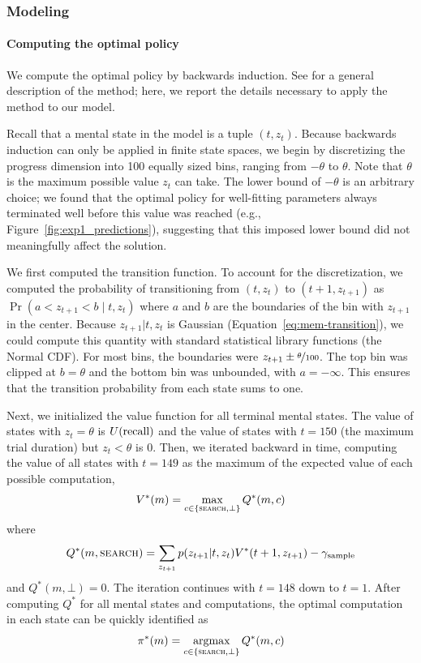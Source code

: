 \subsubsection{Modeling}

\paragraph{Computing the optimal policy}

We compute the optimal policy by backwards induction. See \citet{puterman2014markov} for a general description of the method; here, we report the details necessary to apply the method to our model.

Recall that a mental state in the model is a tuple $(t, z_t)$. Because backwards induction can only be applied in finite state spaces, we begin by discretizing the progress dimension into 100 equally sized bins, ranging from $-\theta$ to $\theta$. Note that $\theta$ is the maximum possible value $z_t$ can take. The lower bound of $-\theta$ is an arbitrary choice; we found that the optimal policy for well-fitting parameters always terminated well before this value was reached (e.g., Figure~\ref{fig:exp1_predictions}), suggesting that this imposed lower bound did not meaningfully affect the solution.

We first computed the transition function. To account for the discretization, we computed the probability of transitioning from $(t, z_t)$ to $(t+1, z_{t+1})$ as $\Pr(a < z_{t+1} < b \mid t, z_t)$ where $a$ and $b$ are the boundaries of the bin with $z_{t+1}$ in the center. Because $z_{t+1}|t,z_t$ is Gaussian (Equation~\ref{eq:mem-transition}), we could compute this quantity with standard statistical library functions (the Normal CDF). For most bins, the boundaries were $z_{t+1} \pm \nicefrac{\theta}{100}$. The top bin was clipped at $b = \theta$ and the bottom bin was unbounded, with $a = -\infty$. This ensures that the transition probability from each state sums to one.

Next, we initialized the value function for all terminal mental states. The value of states with $z_t = \theta$ is $U({\text{recall}})$ and the value of states with $t=150$ (the maximum trial duration) but $z_t < \theta$ is 0. Then, we iterated backward in time, computing the value of all states with $t=149$ as the maximum of the expected value of each possible computation,
%
\begin{equation}
\begin{aligned}
  V^*(m) = \max_{c \in \{\textsc{search}, \bot\}} Q^*(m, c) 
\end{aligned}
\end{equation}
where
%
\begin{equation}
  Q^*(m, \textsc{search}) = \sum_{z_{t+1}} p(z_{t+1} | t, z_t) V^*(t+1, z_{t+1}) - \gamma_\text{sample}
\end{equation}
%
and $Q^*(m, \bot) = 0$. The iteration continues with $t=148$ down to $t=1$. After computing $Q^*$ for all mental states and computations, the optimal computation in each state can be quickly identified as
%
\begin{equation}
  \pi^*(m) = \operatorname*{argmax}_{c \in \{\textsc{search}, \bot\}} Q^*(m, c) 
\end{equation}
%

